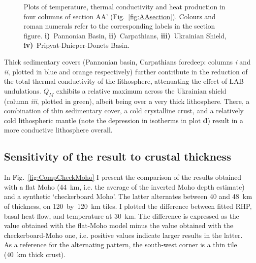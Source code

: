 \begin{figure}
	\begin{adjustbox}{center}
	\end{adjustbox}
	\caption[Plots of temperature, thermal conductivity and heat production in four columns of section AA'.]{Plots of temperature, thermal conductivity and heat production in four columns of section AA' (Fig.~\ref{fig:AAsection}). Colours and roman numerals refer to the corresponding labels in the section figure.
	\textbf{i)}~Pannonian Basin, 
	\textbf{ii)}~Carpathians, 
	\textbf{iii)}~Ukrainian Shield, 
	\textbf{iv)}~Pripyat-Dnieper-Donets Basin.}
	\label{fig:AAsectionCols}
\end{figure}

Thick sedimentary covers (Pannonian basin, Carpathians foredeep: columns \textit{i} and \textit{ii}, plotted in blue and orange respectively) further contribute in the reduction of the total thermal conductivity of the lithosphere, attenuating the effect of LAB undulations.
$Q_M$ exhibits a relative maximum across the Ukrainian shield (column \textit{iii}, plotted in green), albeit being over a very thick lithosphere.
There, a combination of thin sedimentary cover, a cold crystalline crust, and a relatively cold lithospheric mantle (note the depression in isotherms in plot \textbf{d}) result in a more conductive lithosphere overall.

\subsection{Sensitivity of the result to crustal thickness}
\label{ss:Appl:DiscTherm:Sens}

In Fig.~\ref{fig:CompCheckMoho} I present the comparison of the results obtained with a flat Moho (44~\si{\kilo \metre}, i.e. the average of the inverted Moho depth estimate) and a synthetic `checkerboard Moho'.
The latter alternates between \num{40} and \SI{48}{\kilo \metre} of thickness, on \num{120}~by~\SI{120}{\kilo \metre} tiles.
I plotted the difference between fitted RHP, basal heat flow, and temperature at \SI{30}{\kilo \metre}.
The difference is expressed as the value obtained with the flat-Moho model minus the value obtained with the checkerboard-Moho one, i.e. positive values indicate larger results in the latter.
As a reference for the alternating pattern, the south-west corner is a thin tile (\SI{40}{\kilo \metre} thick crust).

